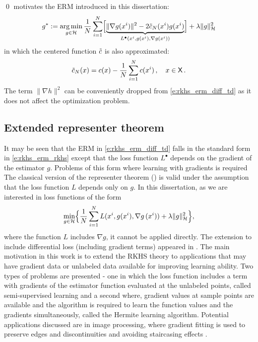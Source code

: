 \qed
{} motivates the ERM introduced in this dissertation:	
\begin{equation}
g^*  := \argmin_{g \in \clH} \frac{1}{N} \sum_{i=1}^N\Bigl[ \underbrace{\| \nabla g(x^i) \|^2 - 2 \tilc_N(x^i)g(x^i)}_{L^\bullet (x^i, g(x^i), \nabla g(x^i))}\Bigr] + \lambda \|g\|^2_\clH
\label{e:rkhs_erm_diff_td}
\end{equation}
in which the centered function $\tilde c$ is also approximated:
\[
\tilc_N(x) = c(x) - \frac{1}{N}  \sum_{i=1}^N  c(x^i)\,,\quad x\in\state\, .
\label{e:rkhs_tilc_N}
\]
The term $\| \nabla h \|^2$ can be conveniently dropped from \eqref{e:rkhs_erm_diff_td} as it does not affect the optimization problem.

\subsection{Extended representer theorem}
It may be seen that the ERM in \eqref{e:rkhs_erm_diff_td} falls in the standard form in \eqref{e:rkhs_erm_rkhs} except that the loss function $L^\bullet$ depends on the gradient of the estimator $g$. Problems of this form where learning with gradients is required The classical version of the representer theorem () is valid under the assumption that the loss function $L$ depends only on $g$. In this dissertation, as we are interested in loss functions of the form 
\begin{equation}
\min_{g\in\clH} \Bigl\{  \frac{1}{N} \sum_{i=1}^N L(x^i,  g(x^i), \nabla g\, (x^i))     + \lambda \| g\|^2_{\clH}  \Bigr\},
\label{e:rkhs_erm_rkhs_gradient}
\end{equation}
where the function $L$ includes $\nabla g$, it cannot be applied directly. The extension to include differential loss (including gradient terms) appeared in \cite{zho08}. The main motivation in this work is to extend the RKHS theory to applications that may have gradient data or unlabeled data available for improving learning ability. Two types of problems are presented - one in which the loss function includes a term with gradients of the estimator function evaluated at the unlabeled points, called semi-supervised learning and a second where, gradient values at sample points are available and the algorithm is required to learn the function values and the gradients simultaneously, called the Hermite learning algorithm. Potential applications discussed are in image processing, where gradient fitting is used to preserve edges and discontinuities and avoiding staircasing effects \cite{didsetste09}. 
 
